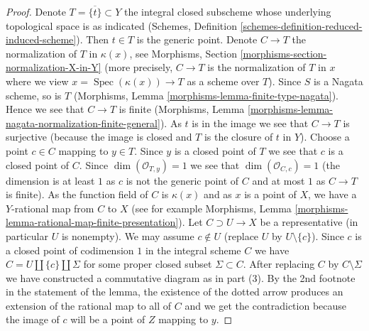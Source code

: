\documentclass[10pt,a4paper]{amsart}
\theoremstyle{plain}
\theoremstyle{definition}
\theoremstyle{remark}
\numberwithin{equation}{subsection}
\def\Spec{\mathop{\mathrm{Spec}}}
\begin{document}
\begin{proof}
\medskip\noindent
Denote $T = \overline{\{t\}} \subset Y$ the integral closed subscheme
whose underlying topological space is as indicated
(Schemes, Definition \ref{schemes-definition-reduced-induced-scheme}).
Then $t \in T$ is the generic point.
Denote $C \to T$ the normalization of $T$ in $\kappa(x)$, see
Morphisms, Section \ref{morphisms-section-normalization-X-in-Y}
(more precisely, $C \to T$ is the normalization of $T$ in $x$
where we view $x = \Spec(\kappa(x)) \to T$ as a scheme over $T$).
Since $S$ is a Nagata scheme, so is $T$
(Morphisms, Lemma \ref{morphisms-lemma-finite-type-nagata}).
Hence we see that $C \to T$ is finite
(Morphisms, Lemma \ref{morphisms-lemma-nagata-normalization-finite-general}).
As $t$ is in the image we see that $C \to T$ is surjective (because
the image is closed and $T$ is the closure of $t$ in $Y$).
Choose a point $c \in C$ mapping to $y \in T$.
Since $y$ is a closed point of $T$ we see that $c$ is
a closed point of $C$. Since $\dim(\mathcal{O}_{T, y}) = 1$
we see that $\dim(\mathcal{O}_{C, c}) = 1$ (the dimension is
at least $1$ as $c$ is not the generic point of $C$ and
at most $1$ as $C \to T$ is finite).
As the function field of $C$ is $\kappa(x)$ and as $x$
is a point of $X$, we have a $Y$-rational map from $C$ to $X$
(see for example Morphisms, Lemma
\ref{morphisms-lemma-rational-map-finite-presentation}).
Let $C \supset U \to X$ be a representative (in particular $U$ is nonempty).
We may assume $c \not \in U$ (replace $U$ by $U \setminus \{c\}$).
Since $c$ is a closed point of codimension $1$ in the integral scheme $C$
we have $C = U \amalg \{c\} \amalg \Sigma$
for some proper closed subset $\Sigma \subset C$.
After replacing $C$ by $C \setminus \Sigma$
we have constructed a commutative diagram as in part (3).
By the 2nd footnote in the statement of the lemma,
the existence of the dotted arrow produces an extension
of the rational map to all of $C$ and we get the contradiction
because the image of $c$ will be a point of $Z$ mapping to $y$.
\end{proof}
\end{document}
